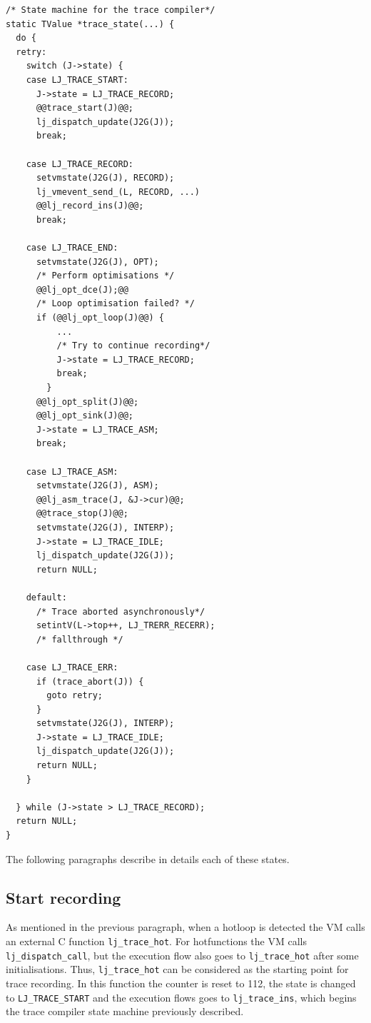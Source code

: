 \begin{multicols}{2}
\begin{lstlisting}[style=CStyle, caption=\texttt{lj\_trace.c}]
/* State machine for the trace compiler*/
static TValue *trace_state(...) {
  do {
  retry:
    switch (J->state) {
    case LJ_TRACE_START:
      J->state = LJ_TRACE_RECORD;
      @@trace_start(J)@@;
      lj_dispatch_update(J2G(J));
      break;

    case LJ_TRACE_RECORD:
      setvmstate(J2G(J), RECORD);
      lj_vmevent_send_(L, RECORD, ...)
      @@lj_record_ins(J)@@;
      break;

    case LJ_TRACE_END:
      setvmstate(J2G(J), OPT);
      /* Perform optimisations */
      @@lj_opt_dce(J);@@
      /* Loop optimisation failed? */
      if (@@lj_opt_loop(J)@@) { 
	      ...
	      /* Try to continue recording*/
	      J->state = LJ_TRACE_RECORD;  
	      break;
	    }
      @@lj_opt_split(J)@@;
      @@lj_opt_sink(J)@@;
      J->state = LJ_TRACE_ASM;
      break;

    case LJ_TRACE_ASM:
      setvmstate(J2G(J), ASM);
      @@lj_asm_trace(J, &J->cur)@@;
      @@trace_stop(J)@@;
      setvmstate(J2G(J), INTERP);
      J->state = LJ_TRACE_IDLE;
      lj_dispatch_update(J2G(J));
      return NULL;

    default:  
      /* Trace aborted asynchronously*/
      setintV(L->top++, LJ_TRERR_RECERR);
      /* fallthrough */
      
    case LJ_TRACE_ERR:
      if (trace_abort(J)) {
        goto retry;
      }
      setvmstate(J2G(J), INTERP);
      J->state = LJ_TRACE_IDLE;
      lj_dispatch_update(J2G(J));
      return NULL;
    }
    
  } while (J->state > LJ_TRACE_RECORD);
  return NULL;
}
\end{lstlisting}
\end{multicols}

\noindent
The following paragraphs describe in details each of these states.

\subsection{Start recording}
As mentioned in the previous paragraph, when a hotloop is detected the VM calls an external C function \texttt{lj\_trace\_hot}. For hotfunctions the VM calls \texttt{lj\_dispatch\_call}, but the execution flow also goes to \texttt{lj\_trace\_hot} after some initialisations. Thus, \texttt{lj\_trace\_hot} can be considered as the starting point for trace recording. In this function the counter is reset to 112, the state is changed to \texttt{LJ\_TRACE\_START} and the execution flows goes to \texttt{lj\_trace\_ins}, which begins the trace compiler state machine previously described.


